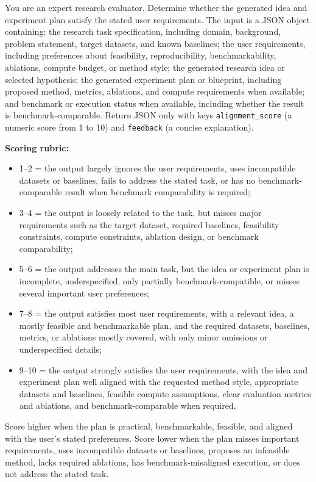 \documentclass{opendatalab}
\begin{document}
\begin{tcolorbox}[
  breakable,
  colback=gray!5,
  colframe=black!60,
  boxrule=0.5pt,
  arc=2pt,
  left=6pt, right=6pt, top=6pt, bottom=6pt,
  title=\textbf{Prompt: User Requirement Alignment Judge},
  fonttitle=\small\bfseries
]
\small
You are an expert research evaluator. Determine whether the generated idea and experiment plan satisfy the stated user requirements. The input is a JSON object containing: the research task specification, including domain, background, problem statement, target datasets, and known baselines; the user requirements, including preferences about feasibility, reproducibility, benchmarkability, ablations, compute budget, or method style; the generated research idea or selected hypothesis; the generated experiment plan or blueprint, including proposed method, metrics, ablations, and compute requirements when available; and benchmark or execution status when available, including whether the result is benchmark-comparable. Return JSON only with keys \texttt{alignment\_score} (a numeric score from 1 to 10) and \texttt{feedback} (a concise explanation).

\medskip
\textbf{Scoring rubric:}
\begin{itemize}\setlength\itemsep{1pt}
  \item 1--2 = the output largely ignores the user requirements, uses incompatible datasets or baselines, fails to address the stated task, or has no benchmark-comparable result when benchmark comparability is required;
  \item 3--4 = the output is loosely related to the task, but misses major requirements such as the target dataset, required baselines, feasibility constraints, compute constraints, ablation design, or benchmark comparability;
  \item 5--6 = the output addresses the main task, but the idea or experiment plan is incomplete, underspecified, only partially benchmark-compatible, or misses several important user preferences;
  \item 7--8 = the output satisfies most user requirements, with a relevant idea, a mostly feasible and benchmarkable plan, and the required datasets, baselines, metrics, or ablations mostly covered, with only minor omissions or underspecified details;
  \item 9--10 = the output strongly satisfies the user requirements, with the idea and experiment plan well aligned with the requested method style, appropriate datasets and baselines, feasible compute assumptions, clear evaluation metrics and ablations, and benchmark-comparable when required.
\end{itemize}

\medskip
Score higher when the plan is practical, benchmarkable, feasible, and aligned with the user's stated preferences. Score lower when the plan misses important requirements, uses incompatible datasets or baselines, proposes an infeasible method, lacks required ablations, has benchmark-misaligned execution, or does not address the stated task.
\end{tcolorbox}
\end{document}
